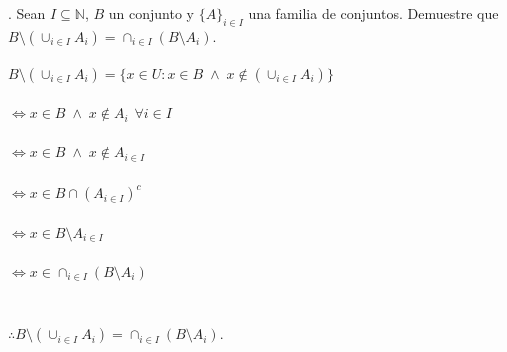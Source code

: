 \section{}
. Sean $I \subseteq \mathbb{N}$, $B$ un conjunto y $\{A\} _{i \in I}$ una familia de conjuntos. Demuestre que $B \setminus (\cup _{i \in I} A_i) = \cap _{i \in I} (B \setminus A_i)$.\\

\paragraph{$B \setminus (\cup _{i \in I} A_i) = \{x \in U: x \in B \; \wedge \; x \notin (\cup _{i \in I} A_i)\}$}

\subparagraph{$\iff x \in B \; \wedge \; x \notin A_i$ $\forall i \in I$}
\subparagraph{$\iff x \in B \; \wedge \; x \notin A_{i \in I}$}
\subparagraph{$\iff x \in B \cap (A_{i \in I})^c $}
\subparagraph{$\iff x \in B \setminus A_{i \in I}$}
\subparagraph{$\iff x \in \cap _{i \in I} (B \setminus A_i)$\\ \\}
$\therefore B \setminus (\cup _{i \in I} A_i) = \cap _{i \in I} (B \setminus A_i)$.\\